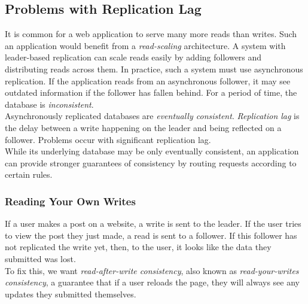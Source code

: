 \documentclass[12pt, titlepage]{article}
\begin{document}
\subsection{Problems with Replication Lag}

It is common for a web application to serve many more reads than writes. Such an application would benefit from a \textit{read-scaling} architecture. A system with leader-based replication can scale reads easily by adding followers and distributing reads across them. In practice, such a system must use asynchronous replication. If the application reads from an asynchronous follower, it may see outdated information if the follower has fallen behind. For a period of time, the database is \textit{inconsistent}. \\

Asynchronously replicated databases are \textit{eventually consistent}. \textit{Replication lag} is the delay between a write happening on the leader and being reflected on a follower. Problems occur with significant replication lag. \\

While its underlying database may be only eventually consistent, an application can provide stronger guarantees of consistency by routing requests according to certain rules.

\subsubsection{Reading Your Own Writes}

If a user makes a post on a website, a write is sent to the leader. If the user tries to view the post they just made, a read is sent to a follower. If this follower has not replicated the write yet, then, to the user, it looks like the data they submitted was lost. \\

To fix this, we want \textit{read-after-write consistency}, also known as \textit{read-your-writes consistency}, a guarantee that if a user reloads the page, they will always see any updates they submitted themselves. \\
\end{document}
